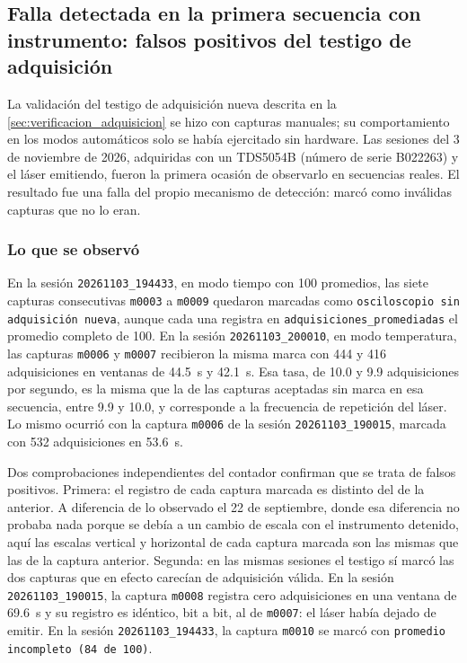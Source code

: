 \subsection{Falla detectada en la primera secuencia con instrumento:
falsos positivos del testigo de adquisición}
\label{sec:falla_testigo}

La validación del testigo de adquisición nueva descrita en la
\cref{sec:verificacion_adquisicion} se hizo con capturas manuales; su
comportamiento en los modos automáticos solo se había ejercitado sin
hardware. Las sesiones del 3 de noviembre de 2026, adquiridas con un
TDS5054B (número de serie B022263) y el láser emitiendo, fueron la
primera ocasión de observarlo en secuencias reales. El resultado fue
una falla del propio mecanismo de detección: marcó como inválidas
capturas que no lo eran.

\subsubsection*{Lo que se observó}

En la sesión \texttt{20261103\_194433}, en modo tiempo con 100
promedios, las siete capturas consecutivas \texttt{m0003} a
\texttt{m0009} quedaron marcadas como \texttt{osciloscopio sin
adquisición nueva}, aunque cada una registra en
\texttt{adquisiciones\_promediadas} el promedio completo de 100. En la
sesión \texttt{20261103\_200010}, en modo temperatura, las capturas
\texttt{m0006} y \texttt{m0007} recibieron la misma marca con 444 y
416 adquisiciones en ventanas de \SI{44.5}{\second} y
\SI{42.1}{\second}. Esa tasa, de 10.0 y 9.9 adquisiciones por segundo,
es la misma que la de las capturas aceptadas sin marca en esa
secuencia, entre 9.9 y 10.0, y corresponde a la frecuencia de
repetición del láser. Lo mismo ocurrió con la captura \texttt{m0006}
de la sesión \texttt{20261103\_190015}, marcada con 532
adquisiciones en \SI{53.6}{\second}.

Dos comprobaciones independientes del contador confirman que se trata
de falsos positivos. Primera: el registro de cada captura marcada es
distinto del de la anterior. A diferencia de lo observado el 22 de
septiembre, donde esa diferencia no probaba nada porque se debía a un
cambio de escala con el instrumento detenido, aquí las escalas vertical
y horizontal de cada captura marcada son las mismas que las de la
captura anterior. Segunda: en
las mismas sesiones el testigo sí marcó las dos capturas que en
efecto carecían de adquisición válida. En la sesión
\texttt{20261103\_190015}, la captura \texttt{m0008} registra cero
adquisiciones en una ventana de \SI{69.6}{\second} y su registro es
idéntico, bit a bit, al de \texttt{m0007}: el láser había dejado de
emitir. En la sesión \texttt{20261103\_194433}, la captura
\texttt{m0010} se marcó con \texttt{promedio incompleto (84 de 100)}.


